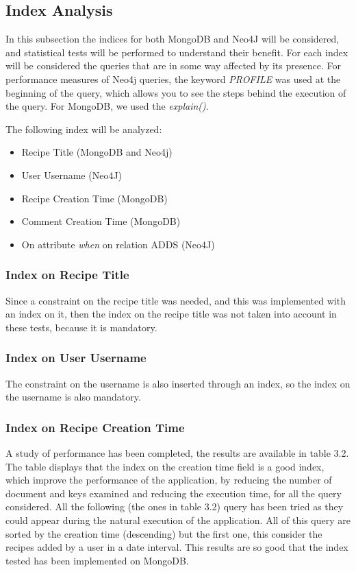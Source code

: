 \documentclass[a4paper]{report}
\begin{document}
\subsection{Index Analysis}

In this subsection the indices for both MongoDB and Neo4J will be considered, and statistical tests will be performed to understand their benefit. For each index will be considered the queries that are in some way affected by its presence. For performance measures of Neo4j queries, the keyword \emph{PROFILE} was used at the beginning of the query, which allows you to see the steps behind the execution of the query. For MongoDB, we used the \emph{explain()}.

\noindent The following index will be analyzed:
\begin{itemize}
	\item Recipe Title (MongoDB and Neo4j)
	\item User Username (Neo4J)
	\item Recipe Creation Time (MongoDB)
	\item Comment Creation Time (MongoDB)
	\item On attribute \emph{when} on relation ADDS (Neo4J)	
\end{itemize}

\subsubsection {Index on Recipe Title}
Since a constraint on the recipe title was needed, and this was implemented with an index on it, then the index on the recipe title was not taken into account in these tests, because it is mandatory.

\subsubsection {Index on User Username}
The constraint on the username is also inserted through an index, so the index on the username is also mandatory.

\subsubsection{Index on Recipe Creation Time}
A study of performance has been completed, the results are available in table 3.2. The table displays that the index on the creation time field is a good index, which improve the performance of the application, by reducing the number of document and keys examined and reducing the execution time, for all the query considered. All the following (the ones in table 3.2) query has been tried as they could appear during the natural execution of the application. All of this query are sorted by the creation time (descending) but the first one, this consider the recipes added by a user in a date interval. This results are so good that the index tested has been implemented on MongoDB.
\end{document}
